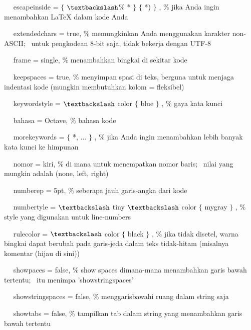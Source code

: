 ~~ escapeinside = $ \{ $ $\textbackslash$$\%$ * $ \} $ $ \{ $ *) $ \} $ , $\%$ jika Anda ingin menambahkan LaTeX dalam kode Anda\par

~~ extendedchars = true, $\%$ memungkinkan Anda menggunakan karakter non-ASCII;~ untuk pengkodean 8-bit saja, tidak bekerja dengan UTF-8\par

~~ frame = single, $\%$ menambahkan bingkai di sekitar kode\par

~~ keepspaces = true, $\%$ menyimpan spasi di teks, berguna untuk menjaga indentasi kode (mungkin membutuhkan kolom = fleksibel)\par

~~ keywordstyle = $\textbackslash$ color $ \{ $ blue $ \} $ , $\%$ gaya kata kunci\par

~~ bahasa = Octave, $\%$ bahasa kode\par

~~ morekeywords = $ \{ $ *, ... $ \} $ , $\%$ jika Anda ingin menambahkan lebih banyak kata kunci ke himpunan\par

~~ nomor = kiri, $\%$ di mana untuk menempatkan nomor baris;~ nilai yang mungkin adalah (none, left, right)\par

~~ numberep = 5pt, $\%$ seberapa jauh garis-angka dari kode\par

~~ numbertyle = $\textbackslash$ tiny $\textbackslash$ color $ \{ $ mygray $ \} $ , $\%$ style yang digunakan untuk line-numbers\par

~~ rulecolor = $\textbackslash$ color $ \{ $ black $ \} $ , $\%$ jika tidak disetel, warna bingkai dapat berubah pada garis-jeda dalam teks tidak-hitam (misalnya komentar (hijau di sini))\par

~~ showpaces = false, $\%$ show spaces dimana-mana menambahkan garis bawah tertentu;~ itu menimpa 'showstringspaces'\par

~~ showstringspaces = false, $\%$ menggarisbawahi ruang dalam string saja\par

~~ showtabs = false, $\%$ tampilkan tab dalam string yang menambahkan garis bawah tertentu\par

